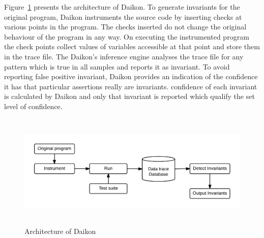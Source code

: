 Figure~\ref{fig:daikon} presents the architecture of Daikon. To generate invariants for the original program, Daikon instruments the source code by inserting checks at various points in the program. The checks inserted do not change the original behaviour of the program in any way. On executing the instrumented program the check points collect values of variables accessible at that point and store them in the trace file. The Daikon's inference engine analyses the trace file for any pattern which is true in all samples and reports it as invariant. To avoid reporting false positive invariant, Daikon provides an indication of the confidence it has that particular assertions really are invariants. confidence of each invariant is calculated by Daikon and only that invariant is reported which qualify the set level of confidence. 

\bigskip
\begin{figure}[H]
\centering
\includegraphics[width= 15.5cm,height=5.5cm]{chapter7/daikonWorking1.png}
\bigskip
\caption{Architecture of Daikon~\cite{ernst2001dynamically}}
\label{fig:daikon}
\end{figure}
\bigskip

